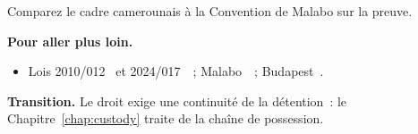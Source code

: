 \begin{boxexo}[title={\ding{45}\quad Exercice~4.10. Comparer \niveauexpert}]
Comparez le cadre camerounais à la Convention de Malabo sur la preuve.
\end{boxexo}

\bigskip

\begin{boxinfo}
\textbf{Pour aller plus loin.}
\begin{itemize}
    \item Lois 2010/012~\cite{loi2010012} et 2024/017~\cite{loi2024017}~;
          Malabo~\cite{malabo2014}~; Budapest~\cite{budapest2001}.
\end{itemize}
\end{boxinfo}

\begin{boxinfo}
\textbf{Transition.} Le droit exige une continuité de la détention~: le
Chapitre~\ref{chap:custody} traite de la chaîne de possession.
\end{boxinfo}
